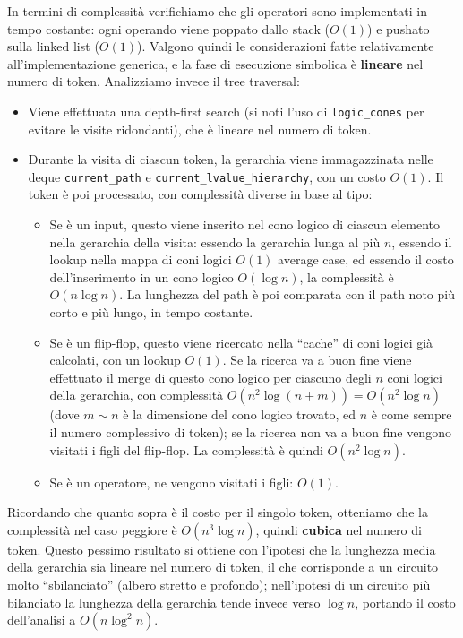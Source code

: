 \documentclass[12pt]{article}
\begin{document}
In termini di complessità verifichiamo che gli operatori sono
implementati in tempo costante: ogni operando viene poppato dallo stack
(\(O(1)\)) e pushato sulla linked list (\(O(1)\)). Valgono quindi le
considerazioni fatte relativamente all'implementazione generica, e la
fase di esecuzione simbolica è \textbf{lineare} nel numero di token.
Analizziamo invece il tree traversal:

\begin{itemize}
\item
  Viene effettuata una depth-first search (si noti l'uso di
  \texttt{logic\_cones} per evitare le visite ridondanti), che è lineare
  nel numero di token.
\item
  Durante la visita di ciascun token, la gerarchia viene immagazzinata
  nelle deque \texttt{current\_path} e
  \texttt{current\_lvalue\_hierarchy}, con un costo \(O(1)\). Il token è
  poi processato, con complessità diverse in base al tipo:

  \begin{itemize}
  \item
    Se è un input, questo viene inserito nel cono logico di ciascun
    elemento nella gerarchia della visita: essendo la gerarchia lunga al
    più \(n\), essendo il lookup nella mappa di coni logici \(O(1)\)
    average case, ed essendo il costo dell'inserimento in un cono logico
    \(O(\log n)\), la complessità è \(O(n \log n)\). La lunghezza del
    path è poi comparata con il path noto più corto e più lungo, in
    tempo costante.
  \item
    Se è un flip-flop, questo viene ricercato nella ``cache'' di coni
    logici già calcolati, con un lookup \(O(1)\). Se la ricerca va a
    buon fine viene effettuato il merge di questo cono logico per
    ciascuno degli \(n\) coni logici della gerarchia, con complessità
    \(O(n^2 \log(n+m)) = O(n^2 \log n)\) (dove \(m \sim n\) è la
    dimensione del cono logico trovato, ed \(n\) è come sempre il numero
    complessivo di token); se la ricerca non va a buon fine vengono
    visitati i figli del flip-flop. La complessità è quindi
    \(O(n^2 \log n)\).
  \item
    Se è un operatore, ne vengono visitati i figli: \(O(1)\).
  \end{itemize}
\end{itemize}

Ricordando che quanto sopra è il costo per il singolo token, otteniamo
che la complessità nel caso peggiore è \(O(n^3 \log n)\), quindi
\textbf{cubica} nel numero di token. Questo pessimo risultato si ottiene
con l'ipotesi che la lunghezza media della gerarchia sia lineare nel
numero di token, il che corrisponde a un circuito molto ``sbilanciato''
(albero stretto e profondo); nell'ipotesi di un circuito più bilanciato
la lunghezza della gerarchia tende invece verso \(\log n\), portando il
costo dell'analisi a \(O(n \log^2 n)\).
\end{document}
